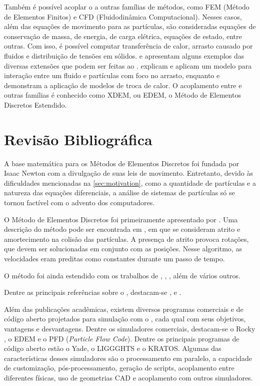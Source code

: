 Também é possível acoplar o \DEM{} a outras famílias de métodos, como FEM (Método de Elementos Finitos) e CFD (Fluidodinâmica Computacional). Nesses casos, além das equações de movimento para as partículas, são consideradas equações de conservação de massa, de energia, de carga elétrica, equações de estado, entre outras. Com isso, é possível computar transferência de calor, arrasto causado por fluidos e distribuição de tensões em sólidos.  e  apresentam alguns exemplos das diversas extensões que podem ser feitas ao \DEM{}.  explicam e aplicam um modelo para interação entre um fluido e partículas com foco no arrasto, enquanto  e  demonstram a aplicação de modelos de troca de calor. O acoplamento entre \DEM{} e outras famílias é conhecido como XDEM, ou EDEM, o Método de Elementos Discretos Estendido.

\section{Revisão Bibliográfica}

A base matemática para os Métodos de Elementos Discretos foi fundada por Isaac Newton com a divulgação de suas leis de movimento. Entretanto, devido às dificuldades mencionadas na \cref{sec:motivation}, como a quantidade de partículas e a natureza das equações diferenciais, a análise de sistemas de partículas só se tornou factível com o advento dos computadores.

O Método de Elementos Discretos foi primeiramente apresentado por . Uma descrição do método pode ser encontrada em , em que se consideram atrito e amortecimento na colisão das partículas. A presença de atrito provoca rotações, que devem ser solucionadas em conjunto com as posições. Nesse algoritmo, as velocidades eram preditas como constantes durante um passo de tempo.

O método foi ainda estendido com os trabalhos de , , , além de vários outros.

Dentre as principais referências sobre o \DEM{}, destacam-se ,  e .

Além das publicações acadêmicas, existem diversos programas comerciais e de código aberto projetados para simulação com o \DEM{}, cada qual com seus objetivos, vantagens e desvantagens. Dentre os simuladores comerciais, destacam-se o Rocky \DEM{}, o EDEM e o PFD (\textit{Particle Flow Code}). Dentre os principais programas de código aberto estão o Yade, o LIGGGHTS e o KRATOS. Algumas das características desses simuladores são o processamento em paralelo, a capacidade de customização, pós-processamento, geração de scripts, acoplamento entre diferentes físicas, uso de geometrias CAD e acoplamento com outros simuladores.

